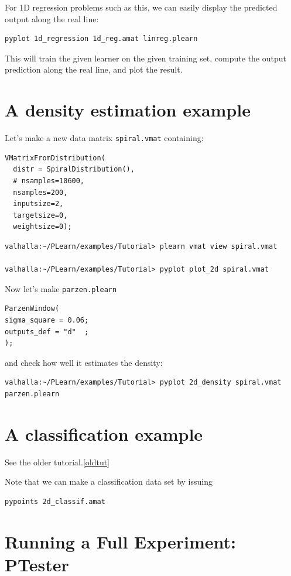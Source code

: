 \documentclass[11pt]{book}
\begin{document}
For 1D regression problems such as this, we can easily display the
predicted output along the real line:
\begin{verbatim}
pyplot 1d_regression 1d_reg.amat linreg.plearn
\end{verbatim}

This will train the given learner on the given training set, compute the
output prediction along the real line, and plot the result.

\section{A density estimation example}

Let's make a new data matrix \verb!spiral.vmat! containing:

\begin{verbatim}
VMatrixFromDistribution(
  distr = SpiralDistribution(),
  # nsamples=10600,
  nsamples=200,
  inputsize=2,
  targetsize=0,
  weightsize=0);
\end{verbatim}

\begin{verbatim}
valhalla:~/PLearn/examples/Tutorial> plearn vmat view spiral.vmat

valhalla:~/PLearn/examples/Tutorial> pyplot plot_2d spiral.vmat
\end{verbatim}

Now let's make \verb!parzen.plearn!
\begin{verbatim}
ParzenWindow(
sigma_square = 0.06;
outputs_def = "d"  ;
);
\end{verbatim}

and check how well it estimates the density:

\begin{verbatim}
valhalla:~/PLearn/examples/Tutorial> pyplot 2d_density spiral.vmat parzen.plearn
\end{verbatim}


\section{A classification example}

See the older tutorial.\ref{oldtut}

Note that we can make a classification data set by issuing
\begin{verbatim}
pypoints 2d_classif.amat
\end{verbatim}

\section{Running a Full Experiment: PTester}
\end{document}
